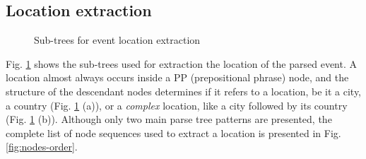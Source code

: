 \documentclass{llncs}
\begin{document}
\subsection{Location extraction}
\label{subsec:approach:location-extraction}

\begin{figure}[h!]
	\centering
	\hspace{20mm}
	\caption{Sub-trees for event location extraction}
	\label{fig:location-extraction}
\end{figure}

Fig. \ref{fig:location-extraction} shows the sub-trees used for extraction the location of the parsed event. A location almost always occurs inside a PP (prepositional phrase) node, and the structure of the descendant nodes determines if it refers to a location, be it a city, a country (Fig. \ref{fig:location-extraction} (a)), or a \textit{complex} location, like a city followed by its country (Fig. \ref{fig:location-extraction} (b)). Although only two main parse tree patterns are presented, the complete list of node sequences used to extract a location is presented in Fig. \ref{fig:nodes-order}.
\end{document}
